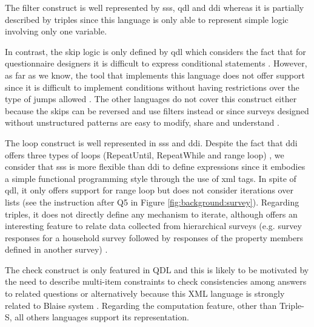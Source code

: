 	The filter construct is well represented by \gls{sss}, \gls{qdl} and \gls{ddi} whereas it is partially described by \gls{triples} since this language is only able to represent simple logic involving only one variable. 

	In contrast, the skip logic is only defined by \gls{qdl} which considers the fact that for questionnaire designers it is difficult to express conditional statements \cite{proc:katz97}. However, as far as we know, the tool that implements this language does not offer support since it is difficult to implement conditions without having restrictions over the type of jumps allowed \cite{art:bethlehem04}. The other languages do not cover this construct either because the skips can be reversed and use filters instead \cite{art:bethke08} or since surveys designed without unstructured patterns are easy to modify, share and understand \cite{web:spencer12}. %

	The loop construct is well represented in \gls{sss} and \gls{ddi}. Despite the fact that \gls{ddi} offers three types of loops (RepeatUntil, RepeatWhile and range loop) \cite{man:thomas09}, we consider that \gls{sss} is more flexible than \gls{ddi} to define expressions since it embodies a simple functional programming style through the use of \gls{xml} tags. In spite of \gls{qdl}, it only offers support for range loop but does not consider iterations over lists (see the instruction after Q5 in Figure \ref{fig:background:survey}). Regarding \gls{triples}, it does not directly define any mechanism to iterate, although offers an interesting feature to relate data collected from hierarchical surveys (e.g. survey responses for a household survey followed by responses of the property members defined in another survey) \cite{proc:wright07}.

	The check construct is only featured in QDL and this is likely to be motivated by the need to describe multi-item constraints to check consistencies among answers to related questions \cite{proc:katz97} or alternatively because this XML language is strongly related to Blaise system \cite{proc:bethlehem00}. Regarding the computation feature, other than Triple-S, all others languages support its representation.